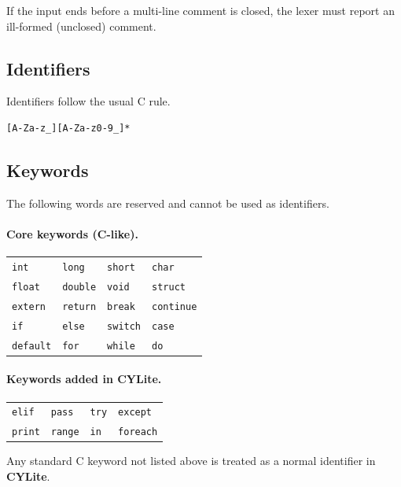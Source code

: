 \documentclass[11pt]{article}
\newcommand{\lang}{\textbf{CYLite}}
\begin{document}
If the input ends before a multi-line comment is closed, the lexer must report an ill-formed (unclosed) comment.

\subsection{Identifiers}
Identifiers follow the usual C rule.
\begin{lstlisting}
[A-Za-z_][A-Za-z0-9_]*
\end{lstlisting}

\subsection{Keywords}
The following words are reserved and cannot be used as identifiers.

\paragraph{Core keywords (C-like).}
\begin{center}
\begin{tabular}{llll}
\toprule
	\texttt{int} & \texttt{long} & \texttt{short} & \texttt{char} \\
	\texttt{float} & \texttt{double} & \texttt{void} & \texttt{struct} \\
	\texttt{extern} & \texttt{return} & \texttt{break} & \texttt{continue} \\
	\texttt{if} & \texttt{else} & \texttt{switch} & \texttt{case} \\
	\texttt{default} & \texttt{for} & \texttt{while} & \texttt{do} \\
\bottomrule
\end{tabular}
\end{center}

\paragraph{Keywords added in \lang{}.}
\begin{center}
\begin{tabular}{llll}
\toprule
	\texttt{elif} & \texttt{pass} & \texttt{try} & \texttt{except} \\
	\texttt{print} & \texttt{range} & \texttt{in} & \texttt{foreach} \\
\bottomrule
\end{tabular}
\end{center}

Any standard C keyword not listed above is treated as a normal identifier in \lang{}.
\end{document}
